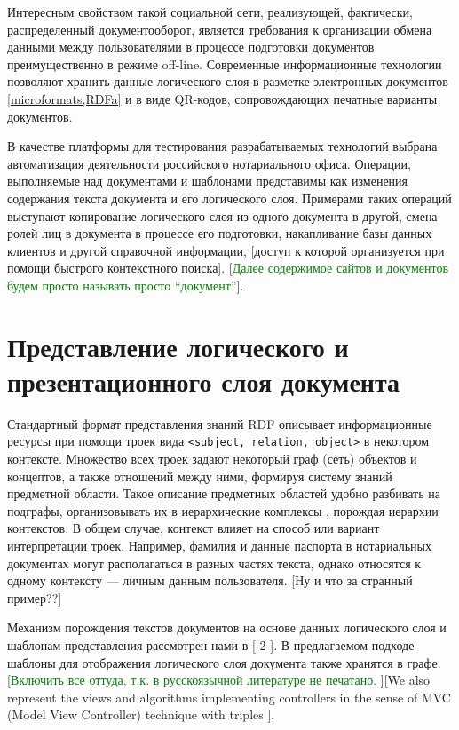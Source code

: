 \documentclass[utf8]{../IncArticle}
\newcommand{\e}[2][fcolor]{\textcolor{pcolor}{[}\textcolor{#1}{#2}\textcolor{pcolor}{]}}
\begin{document}
Интересным свойством такой социальной сети, реализующей, фактически,
распределенный документооборот, является требования к организации
обмена данными между пользователями в процессе подготовки документов
преимущественно в режиме off-line.  Современные информационные
технологии позволяют хранить данные логического слоя в разметке
электронных документов \ref{microformats,RDFa} и в виде QR-кодов,
сопровождающих печатные варианты документов.

В качестве платформы для тестирования разрабатываемых технологий
выбрана автоматизация деятельности российского нотариального
офиса.  Операции, выполняемые над документами и шаблонами представимы
как изменения содержания текста документа и его логического
слоя.  Примерами таких операций выступают копирование логического слоя
из одного документа в другой, смена ролей лиц в документа в процессе
его подготовки, накапливание базы данных клиентов и другой справочной
информации, \e{доступ к которой организуется при помощи быстрого
контекстного поиска}. \e[green]{Далее содержимое сайтов и документов будем
просто называть просто ``документ''}.

\section{Представление логического и презентационного слоя документа}

Стандартный формат представления знаний RDF описывает информационные
ресурсы при помощи троек вида \texttt{<subject, relation, object>} в
некотором контексте.  Множество всех троек задают некоторый граф (сеть)
объектов и концептов, а также отношений между ними, формируя систему
знаний предметной области.  Такое описание предметных областей удобно
разбивать на подграфы, организовывать их в иерархические комплексы
\cite{b4}, порождая иерархии контекстов.  В общем случае, контекст
влияет на способ или вариант интерпретации троек.  Например, фамилия и
данные паспорта в нотариальных документах могут располагаться в разных
частях текста, однако относятся к одному контексту --- личным данным
пользователя.  \e{Ну и что за странный пример??}

Механизм порождения текстов документов на основе данных логического
слоя и шаблонам представления рассмотрен нами в [-2-].  В предлагаемом
подходе шаблоны для отображения логического слоя документа также
хранятся в графе.  \e[green]{Включить все оттуда, т.к. в русскоязычной
  литературе не печатано.  }\e{We also represent the views and
  algorithms implementing controllers in the sense of MVC (Model View
  Controller) technique with triples \cite{b5}}.
\end{document}
